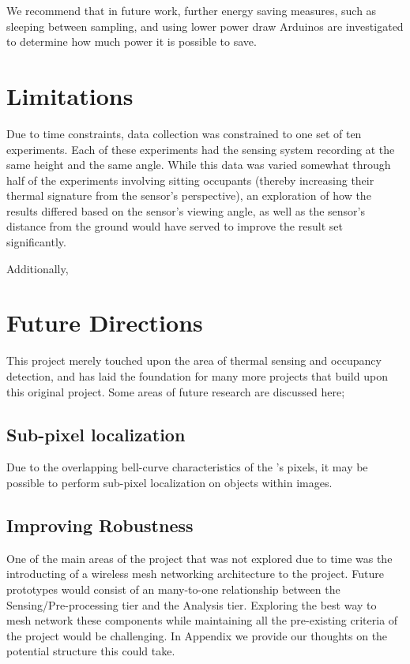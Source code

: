 \documentclass[../thesis/thesis.tex]{subfiles}
\begin{document}
We recommend that in future work, further energy saving measures, such as sleeping between sampling, and using lower power draw Arduinos are investigated to determine how much power it is possible to save.

\section{Limitations}
Due to time constraints, data collection was constrained to one set of ten experiments. Each of these experiments had the sensing system recording at the same height and the same angle. While this data was varied somewhat through half of the experiments involving sitting occupants (thereby increasing their thermal signature from the sensor's perspective), an exploration of how the results differed based on the sensor's viewing angle, as well as the sensor's distance from the ground would have served to improve the result set significantly.

Additionally, 

\section{Future Directions}
This project merely touched upon the area of thermal sensing and occupancy detection, and has laid the foundation for many more projects that build upon this original project. Some areas of future research are discussed here;

\subsection{Sub-pixel localization}
Due to the overlapping bell-curve characteristics of the \mlx's pixels, it may be possible to perform sub-pixel localization on objects within images. %

\subsection{Improving Robustness}
One of the main areas of the project that was not explored due to time was the introducting of a wireless mesh networking architecture to the project. Future prototypes would consist of an many-to-one relationship between the Sensing/Pre-processing tier and the Analysis tier. Exploring the best way to mesh network these components while maintaining all the pre-existing criteria of the project would be challenging. In Appendix  we provide our thoughts on the potential structure this could take.
\end{document}
